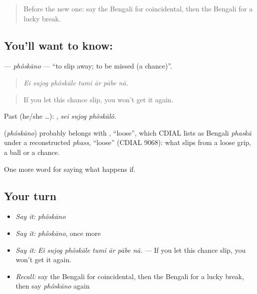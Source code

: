 \label{lesson:BN-C533-phoskano}



\begin{quote}
Before the new one: say the Bengali for coincidental, then the Bengali for a lucky break.
\end{quote}

\subsection*{You'll want to know: }
\textbf{} — \emph{phôskāno} — \textquotedblleft{}to slip away; to be missed (a chance)\textquotedblright{}.

\begin{quote}
      
\end{quote}

\begin{quote}
\emph{Ei sujog phôskāle tumi ār pābe nā.}
\end{quote}

\begin{quote}
If you let this chance slip, you won't get it again.
\end{quote}

Past (he/she …):   , \emph{sei sujog phôskālô}.

\begin{cousinweb}
\textbf{} (\emph{phôskāno}) probably belongs with , \textquotedblleft{}loose\textquotedblright{}, which CDIAL lists as Bengali \emph{phaskā} under a reconstructed \emph{phass}, \textquotedblleft{}loose\textquotedblright{} (CDIAL 9068): what slips from a loose grip, a ball or a chance.
\end{cousinweb}

\begin{grammarlens}[title={What you've built}]
One more word for saying what happens if.
\end{grammarlens}

\subsection*{Your turn}
\begin{itemize}
\raggedright
  \item \emph{Say it:} \emph{phôskāno}
  \item \emph{Say it:} \emph{phôskāno}, once more
  \item \emph{Say it:} \emph{Ei sujog phôskāle tumi ār pābe nā.} — If you let this chance slip, you won't get it again.
  \item \emph{Recall:} say the Bengali for coincidental, then the Bengali for a lucky break, then say \emph{phôskāno} again
\end{itemize}

